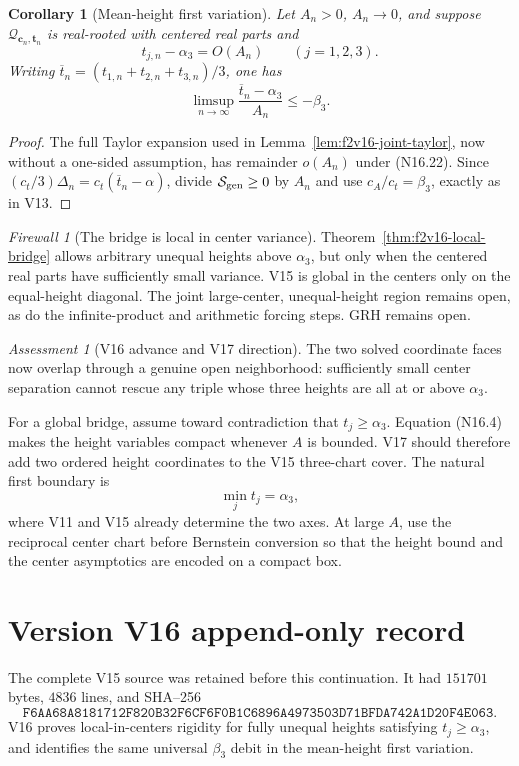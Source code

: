 \documentclass[11pt]{article}
\newtheorem{corollary}[theorem]{Corollary}
\theoremstyle{definition}
\theoremstyle{remark}
\newtheorem{assessment}[theorem]{Assessment}
\newtheorem{firewall}[theorem]{Firewall}
\begin{document}
\begin{corollary}[Mean-height first variation]
\label{cor:f2v16-mean-debit}
Let \(A_n>0\), \(A_n\to0\), and suppose
\(\mathcal Q_{\mathbf c_n,\mathbf t_n}\) is real-rooted with centered real
parts and
\[
 t_{j,n}-\alpha_3=O(A_n)\qquad(j=1,2,3).
 \tag{N16.22}
\]
Writing \(\overline t_n=(t_{1,n}+t_{2,n}+t_{3,n})/3\), one has
\[
 \limsup_{n\to\infty}
 \frac{\overline t_n-\alpha_3}{A_n}
 \leq-\beta_3.
 \tag{N16.23}
\]
\end{corollary}

\begin{proof}
The full Taylor expansion used in
Lemma~\ref{lem:f2v16-joint-taylor}, now without a one-sided assumption,
has remainder \(o(A_n)\) under \textup{(N16.22)}.  Since
\((c_t/3)\Delta_n=c_t(\overline t_n-\alpha)\), divide
\(\mathcal S_{\rm gen}\geq0\) by \(A_n\) and use
\(c_A/c_t=\beta_3\), exactly as in V13.
\end{proof}

\begin{firewall}[The bridge is local in center variance]
Theorem~\ref{thm:f2v16-local-bridge} allows arbitrary unequal heights
above \(\alpha_3\), but only when the centered real parts have sufficiently
small variance.  V15 is global in the centers only on the equal-height
diagonal.  The joint large-center, unequal-height region remains open, as
do the infinite-product and arithmetic forcing steps.  GRH remains open.
\end{firewall}

\begin{assessment}[V16 advance and V17 direction]
The two solved coordinate faces now overlap through a genuine open
neighborhood: sufficiently small center separation cannot rescue any
triple whose three heights are all at or above \(\alpha_3\).

For a global bridge, assume toward contradiction that \(t_j\geq\alpha_3\).
Equation \textup{(N16.4)} makes the height variables compact whenever
\(A\) is bounded.  V17 should therefore add two ordered height coordinates
to the V15 three-chart cover.  The natural first boundary is
\[
 \min_jt_j=\alpha_3,
 \tag{N16.24}
\]
where V11 and V15 already determine the two axes.  At large \(A\), use the
reciprocal center chart before Bernstein conversion so that the height
bound and the center asymptotics are encoded on a compact box.
\end{assessment}

\section*{Version V16 append-only record}
The complete V15 source was retained before this continuation.  It had
\(151701\) bytes, \(4836\) lines, and SHA--256
\[
 \texttt{F6AA68A8181712F820B32F6CF6F0B1C6896A4973503D71BFDA742A1D20F4E063}.
\]
V16 proves local-in-centers rigidity for fully unequal heights satisfying
\(t_j\geq\alpha_3\), and identifies the same universal
\(\beta_3\) debit in the mean-height first variation.
\end{document}
